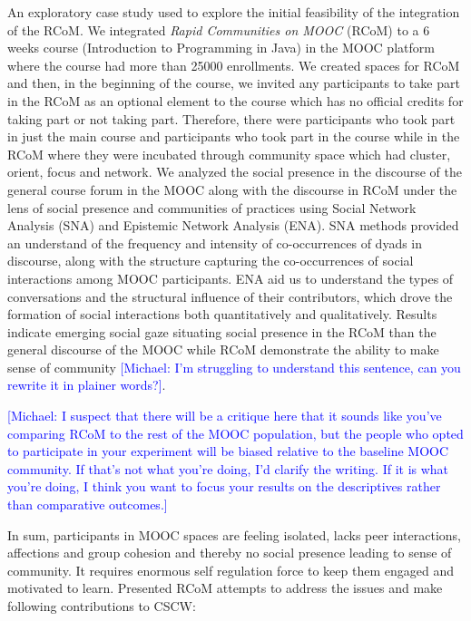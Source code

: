 \documentclass[format=acmsmall, review=false, screen=true]{acmart}
\newcommand{\msb}[1]{{\textcolor{blue}{ [Michael: #1]}}}
\begin{document}
An exploratory case study used to explore the initial feasibility of the integration of the RCoM. We integrated \textit{Rapid Communities on MOOC} (RCoM) to a 6 weeks course (Introduction to Programming in Java) in the MOOC platform where the course had more than 25000 enrollments. We created spaces for RCoM and then, in the beginning of the course, we invited any participants to take part in the RCoM as an optional element to the course which has no official credits for taking part or not taking part. Therefore, there were participants who took part in just the main course and participants who took part in the course while in the RCoM where they were incubated through community space which had cluster, orient, focus and network. We analyzed the social presence in the discourse of the general course forum in the MOOC along with the discourse in RCoM under the lens of social presence and communities of practices using Social Network Analysis (SNA) and Epistemic Network Analysis (ENA). SNA methods provided an understand of the frequency and intensity of co-occurrences of dyads in discourse, along with the structure capturing the co-occurrences of social interactions among MOOC participants. ENA aid us to understand the types of conversations and the structural influence of their contributors, which drove the formation of social interactions both quantitatively and qualitatively. Results indicate emerging social gaze situating social presence in the RCoM than the general discourse of the MOOC while RCoM demonstrate the ability to make sense of community \msb{I'm struggling to understand this sentence, can you rewrite it in plainer words?}. 

\msb{I suspect that there will be a critique here that it sounds like you've comparing RCoM to the rest of the MOOC population, but the people who opted to participate in your experiment will be biased relative to the baseline MOOC community. If that's not what you're doing, I'd clarify the writing. If it is what you're doing, I think you want to focus your results on the descriptives rather than comparative outcomes.}

In sum, participants in MOOC spaces are feeling isolated, lacks peer interactions, affections and group cohesion and thereby no social presence leading to sense of community. It requires enormous self regulation force to keep them engaged and motivated to learn. Presented RCoM attempts to address the issues and make following contributions to CSCW: 
\end{document}
